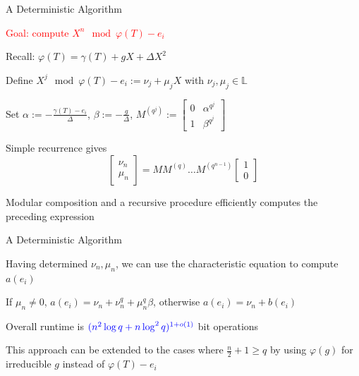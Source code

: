 \documentclass{beamer}
\newcommand{\blue}{\textcolor{blue}}
\newcommand{\red}{\textcolor{red}}
\newcommand{\red}{\textnormal{red}}
\begin{document}

\begin{frame}{A Deterministic Algorithm}

\item \red{Goal: compute $X^n \mod \varphi(T) - e_i$}
\item Recall: $\varphi(T) = \gamma(T) + gX + \Delta X^2$
    
    \item Define $X^j \mod \varphi(T) - e_i := \nu_j + \mu_j X $ with $\nu_j, \mu_j \in \mathbb{L}$
    
    \item Set $\alpha := -\frac{\gamma(T) - e_i}{\Delta}$, $\beta := - \frac{g}{\Delta}$, $M^{(q^j)} := \begin{bmatrix} 0 & \alpha^{q^j} \\ 1 & \beta^{q^j} \end{bmatrix}$
    
    \item Simple recurrence gives 
    \[\begin{bmatrix} \nu_{n} \\ \mu_n  \end{bmatrix} = M M^{(q)} \ldots M^{(q^{n-1})}  \begin{bmatrix} 1 \\ 0  \end{bmatrix}\]
    
    \item Modular composition and a recursive procedure efficiently computes the preceding expression 

    
\end{frame}


\begin{frame}{A Deterministic Algorithm}

    \item Having determined $\nu_n, \mu_n$, we can use the characteristic equation to compute $a(e_i)$
        \item If $\mu_n \neq 0$, $a(e_i) = \nu_n + \nu_n^q + \mu_n^q \beta$, otherwise $a(e_i) = \nu_n + b(e_i)$
    \item Overall runtime is $\blue{(n^2 \log q + n \log^2 q)^{1+o(1)}}$ bit operations

    \item This approach can be extended to the cases where $\frac{n}{2} + 1 \geq q$ by using $\varphi(g)$ for irreducible $g$ instead of $\varphi(T) - e_i$

    
\end{frame}
\end{document}
